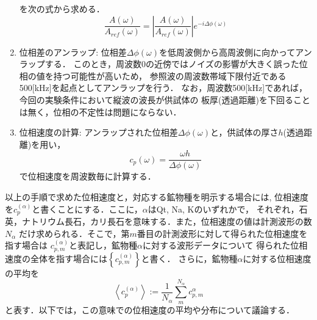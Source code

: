 \begin{enumerate}
を次の式から求める．
\begin{equation}
	\frac{A(\omega)}{A_{ref}(\omega)}
	=
	\left|
	\frac{A(\omega)}{A_{ref}(\omega)}
	\right|
	e^{-i\Delta \phi(\omega)}
	\label{eqn:deconv}
\end{equation}
\item
位相差のアンラップ:
	位相差$\Delta \phi(\omega)$を低周波側から高周波側に向かってアンラップする．
	このとき，周波数$0$の近傍ではノイズの影響が大きく誤った位相の値を持つ可能性が高いため，
	参照波の周波数帯域下限付近である500[kHz]を起点としてアンラップを行う．
	なお，周波数500[kHz]であれば，今回の実験条件において縦波の波長が供試体の
	板厚(透過距離)を下回ることは無く，位相の不定性は問題にならない．
\item
位相速度の計算:
	アンラップされた位相差$\Delta \phi(\omega)$と，供試体の厚さ$h$(透過距離)を用い，
\begin{equation}
	c_p(\omega)=\frac{\omega h}{\Delta \phi(\omega)}
	\label{eqn:cp_phi}
\end{equation}
	で位相速度を周波数毎に計算する．
\end{enumerate}
以上の手順で求めた位相速度と，対応する鉱物種を明示する場合には,
位相速度を$c_p^{(\alpha)}$と書くことにする．ここに，$\alpha$はQt, Na, Kのいずれかで，
それぞれ，石英，ナトリウム長石，カリ長石を意味する．また，位相速度の値は計測波形の数$N_\alpha$
だけ求められる．そこで，第$m$番目の計測波形に対して得られた位相速度を指す場合は
$c_{p,m}^{(\alpha)}$と表記し，鉱物種$\alpha$に対する波形データについて
得られた位相速度の全体を指す場合には$\left\{ c_{p,m}^{(\alpha)}\right\}$と書く．
さらに，鉱物種$\alpha$に対する位相速度の平均を
\begin{equation}
	\left< c_p^{(\alpha)}\right>:= \frac{1}{N_\alpha}\sum_{m}^{N_\alpha} c_{p,m}^{\alpha }
	\label{eqn:}
\end{equation}
と表す．以下では，この意味での位相速度の平均や分布について議論する．
